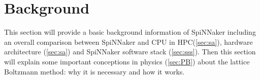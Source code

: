 \section{Background} \label{sec:bg}


This section will provide a basic background information of SpiNNaker including an overall comparison between SpiNNaker and CPU in HPC(\ref{sec:sa}), hardware architecture (\ref{sec:sa}) and SpiNNaker software stack (\ref{sec:sss}). Then this section will explain some important conceptions in physics (\ref{sec:PB}) about the lattice Boltzmann method: why it is necessary and how it works. 





